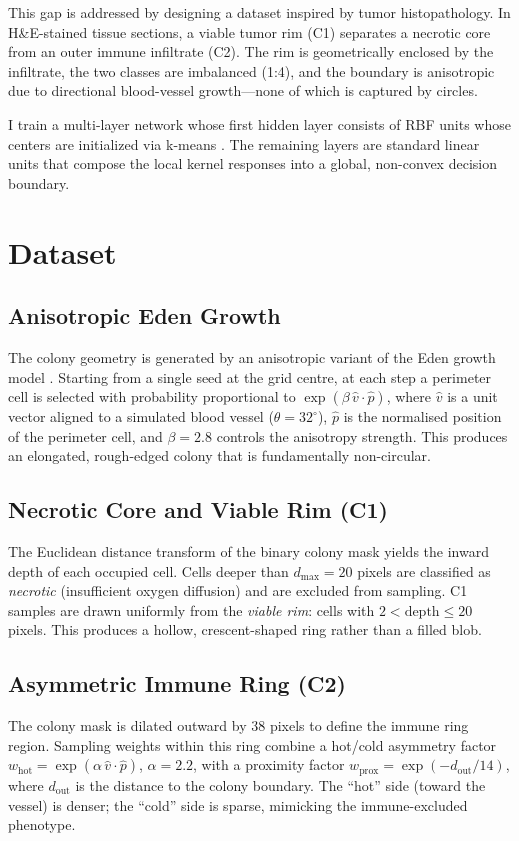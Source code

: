 \documentclass[conference]{IEEEtran}
\begin{document}
This gap is addressed by designing a dataset inspired by tumor histopathology.
In H\&E-stained tissue sections, a viable tumor rim (C1) separates a
necrotic core from an outer immune infiltrate (C2).
The rim is geometrically enclosed by the infiltrate, the two classes are
imbalanced (1:4), and the boundary is anisotropic due to directional
blood-vessel growth---none of which is captured by circles.

I train a multi-layer network whose first hidden layer consists of RBF
units whose centers are initialized via k-means \cite{moody1989fast}.
The remaining layers are standard linear units that compose the local
kernel responses into a global, non-convex decision boundary.

\section{Dataset}
\label{sec:dataset}

\subsection{Anisotropic Eden Growth}
The colony geometry is generated by an anisotropic variant of the Eden
growth model \cite{eden1961two}.  Starting from a single seed at the
grid centre, at each step a perimeter cell is selected with probability
proportional to $\exp(\beta\,\hat{v}\cdot\hat{p})$, where $\hat{v}$ is a
unit vector aligned to a simulated blood vessel ($\theta{=}32^{\circ}$),
$\hat{p}$ is the normalised position of the perimeter cell, and $\beta{=}2.8$
controls the anisotropy strength.  This produces an elongated, rough-edged
colony that is fundamentally non-circular.

\subsection{Necrotic Core and Viable Rim (C1)}
The Euclidean distance transform of the binary colony mask yields the
inward depth of each occupied cell.  Cells deeper than $d_{\max}{=}20$
pixels are classified as \emph{necrotic} (insufficient oxygen diffusion) and
are excluded from sampling.  C1 samples are drawn uniformly from the
\emph{viable rim}: cells with $2 < \text{depth} \le 20$ pixels.
This produces a hollow, crescent-shaped ring rather than a filled blob.

\subsection{Asymmetric Immune Ring (C2)}
The colony mask is dilated outward by 38 pixels to define the immune ring
region.  Sampling weights within this ring combine a hot/cold asymmetry
factor $w_{\text{hot}} = \exp(\alpha\,\hat{v}\cdot\hat{p})$, $\alpha{=}2.2$,
with a proximity factor $w_{\text{prox}} = \exp(-d_{\text{out}}/14)$, where
$d_{\text{out}}$ is the distance to the colony boundary.
The ``hot'' side (toward the vessel) is denser; the ``cold'' side
is sparse, mimicking the immune-excluded phenotype.
\end{document}
